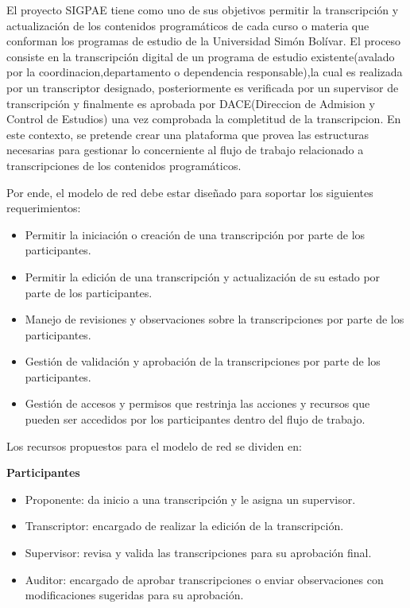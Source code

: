 El proyecto SIGPAE tiene como uno de sus objetivos permitir la transcripción y actualización  de los contenidos programáticos de cada curso o materia que conforman los programas de estudio de la Universidad Simón Bolívar. El proceso consiste en la transcripción digital de un programa de estudio existente(avalado por la coordinacion,departamento o dependencia responsable),la cual es realizada por un transcriptor designado, posteriormente es verificada por un supervisor de transcripción y finalmente es aprobada por DACE(Direccion de Admision y Control de Estudios) una vez comprobada la completitud de la transcripcion. En este contexto, se pretende  crear una plataforma que provea las estructuras necesarias para gestionar lo concerniente al flujo de trabajo relacionado a transcripciones de los contenidos programáticos. 


Por ende, el modelo de red debe estar diseñado para soportar los siguientes requerimientos:

\begin{itemize}
    \item Permitir la iniciación o creación de una transcripción por parte de los participantes.
    \item Permitir la edición de una transcripción  y actualización de su estado por parte de los participantes.
    \item Manejo de revisiones y observaciones sobre la transcripciones por parte de los participantes.
    \item Gestión de validación y aprobación de la transcripciones por parte de los participantes.
    \item Gestión de accesos y permisos que restrinja las acciones y recursos que pueden ser accedidos por los participantes dentro del flujo de trabajo.
\end{itemize}

Los recursos propuestos para el modelo de red se dividen en:

\textbf{Participantes}
\begin{itemize}
    \item Proponente: da inicio a una transcripción y le asigna un supervisor.
    \item Transcriptor: encargado de realizar la edición de la transcripción.
    \item Supervisor: revisa y valida las transcripciones para su aprobación final.
    \item Auditor: encargado de aprobar transcripciones o enviar observaciones con modificaciones sugeridas para su aprobación.
\end{itemize}

